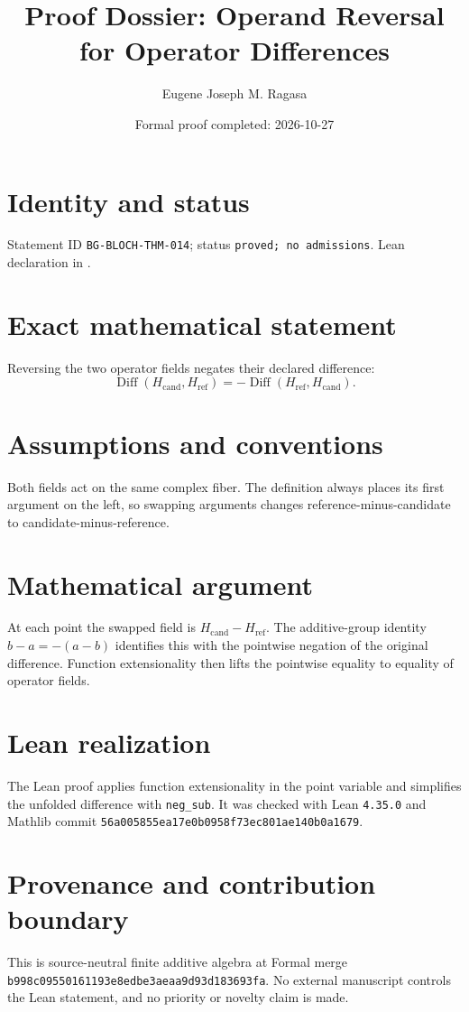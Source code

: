 \documentclass[11pt]{article}
\title{Proof Dossier: Operand Reversal for Operator Differences}
\author{Eugene Joseph M. Ragasa}
\date{Formal proof completed: 2026-10-27}
\begin{document}
\raggedright
\maketitle

\section{Identity and status}
Statement ID \texttt{BG-BLOCH-THM-014}; status \texttt{proved; no admissions}. Lean declaration
 in
.

\section{Exact mathematical statement}
Reversing the two operator fields negates their declared difference:
\[
  \operatorname{Diff}(H_{\mathrm{cand}},H_{\mathrm{ref}})
  =-\operatorname{Diff}(H_{\mathrm{ref}},H_{\mathrm{cand}}).
\]

\section{Assumptions and conventions}
Both fields act on the same complex fiber. The definition always places its first argument on
the left, so swapping arguments changes reference-minus-candidate to candidate-minus-reference.

\section{Mathematical argument}
At each point the swapped field is $H_{\mathrm{cand}}-H_{\mathrm{ref}}$. The additive-group
identity $b-a=-(a-b)$ identifies this with the pointwise negation of the original difference.
Function extensionality then lifts the pointwise equality to equality of operator fields.

\section{Lean realization}
The Lean proof applies function extensionality in the point variable and simplifies the unfolded
difference with \texttt{neg\_sub}. It was checked with Lean \texttt{4.35.0} and Mathlib commit
\texttt{56a005855ea17e0b0958f73ec801ae140b0a1679}.

\section{Provenance and contribution boundary}
This is source-neutral finite additive algebra at Formal merge
\texttt{b998c09550161193e8edbe3aeaa9d93d183693fa}. No external manuscript controls the Lean
statement, and no priority or novelty claim is made.
\end{document}
